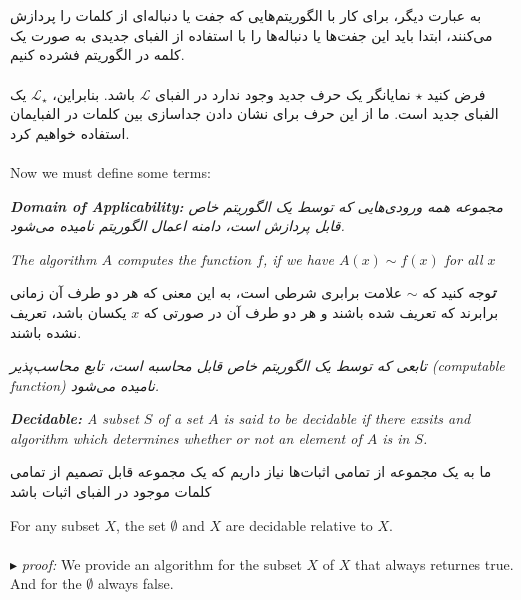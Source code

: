 \documentclass[10pt,a4paper]{article}
\newenvironment{callout}
	{\begin{calloutbox}\color{charcoal}\textbf\textit}
	{\end{calloutbox}}
\newcommand{\curveL}{\mathcal{L}}
\newcommand{\proof}{\\ \ \\ $\blacktriangleright$ \textit{proof: }}
\begin{document}
                        \\
                        \\
به عبارت دیگر، برای کار با الگوریتم‌هایی که جفت یا دنباله‌ای از کلمات را پردازش می‌کنند، ابتدا باید این جفت‌ها یا دنباله‌ها را با استفاده از الفبای جدیدی به صورت یک کلمه در الگوریتم فشرده کنیم.
                        \\
                        \\
فرض کنید $\star$ نمایانگر یک حرف جدید وجود ندارد در الفبای $\curveL$ باشد. بنابراین، $\curveL_\star$ یک الفبای جدید است. ما از این حرف برای نشان دادن جداسازی بین کلمات در الفبایمان استفاده خواهیم کرد.
                        \\
                        \\
                        Now we must define some terms:
                        \begin{define}
                            \textit{\textbf{Domain of Applicability:} مجموعه همه ورودی‌هایی که توسط یک الگوریتم خاص قابل پردازش است، دامنه اعمال الگوریتم نامیده می‌شود.}
                        \end{define}
                        \begin{define}
                            \textit{The algorithm $A$ computes the function $f$, if we have $A(x)\sim f(x)$ for all $x$}
                        \end{define}
                        \begin{callout}
توجه کنید که $\sim$ علامت برابری شرطی است، به این معنی که هر دو طرف آن زمانی برابرند که تعریف شده باشند و هر دو طرف آن در صورتی که $x$ یکسان باشد، تعریف نشده باشند.
                        \end{callout}
                        \begin{define}
                            \textit{تابعی که توسط یک الگوریتم خاص قابل محاسبه است، تابع محاسب‌پذیر (computable function) نامیده می‌شود.}
                        \end{define}
                        \begin{define}
                            \textit{\textbf{Decidable:} A subset $S$ of a set $A$ is said to be decidable if there exsits and algorithm which determines whether or not an element of $A$ is in $S$.}
                        \end{define}
ما به یک مجموعه از تمامی اثبات‌ها نیاز داریم که یک مجموعه قابل تصمیم از تمامی کلمات موجود در الفبای اثبات باشد
                        \begin{lemma}
                            For any subset $X$, the set $\emptyset$ and $X$ are decidable relative to $X$.
                            \proof We provide an algorithm for the subset $X$ of $X$ that always returnes true. And for the $\emptyset$ always false.
                        \end{lemma}
\end{document}
